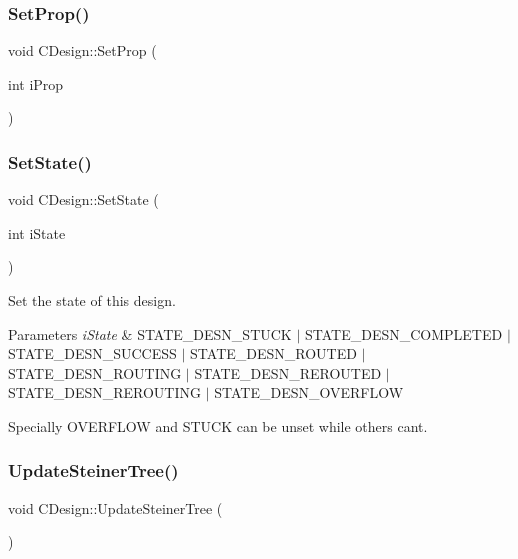 \subsubsection{\texorpdfstring{SetProp()}{SetProp()}}
{\footnotesize\ttfamily void C\+Design\+::\+Set\+Prop (\begin{DoxyParamCaption}\item[{int}]{i\+Prop }\end{DoxyParamCaption})}

\mbox{\label{classCDesign_adda7bcca7062f58a27baa043bd315bfd}} 
\subsubsection{\texorpdfstring{SetState()}{SetState()}}
{\footnotesize\ttfamily void C\+Design\+::\+Set\+State (\begin{DoxyParamCaption}\item[{int}]{i\+State }\end{DoxyParamCaption})}



Set the state of this design. 


\begin{DoxyParams}{Parameters}
{\em i\+State} & S\+T\+A\+T\+E\+\_\+\+D\+E\+S\+N\+\_\+\+S\+T\+U\+CK $\vert$ S\+T\+A\+T\+E\+\_\+\+D\+E\+S\+N\+\_\+\+C\+O\+M\+P\+L\+E\+T\+ED $\vert$ S\+T\+A\+T\+E\+\_\+\+D\+E\+S\+N\+\_\+\+S\+U\+C\+C\+E\+SS $\vert$ S\+T\+A\+T\+E\+\_\+\+D\+E\+S\+N\+\_\+\+R\+O\+U\+T\+ED $\vert$ S\+T\+A\+T\+E\+\_\+\+D\+E\+S\+N\+\_\+\+R\+O\+U\+T\+I\+NG $\vert$ S\+T\+A\+T\+E\+\_\+\+D\+E\+S\+N\+\_\+\+R\+E\+R\+O\+U\+T\+ED $\vert$ S\+T\+A\+T\+E\+\_\+\+D\+E\+S\+N\+\_\+\+R\+E\+R\+O\+U\+T\+I\+NG $\vert$ S\+T\+A\+T\+E\+\_\+\+D\+E\+S\+N\+\_\+\+O\+V\+E\+R\+F\+L\+OW\\
\hline
\end{DoxyParams}
Specially O\+V\+E\+R\+F\+L\+OW and S\+T\+U\+CK can be unset while others can\textquotesingle{}t. \mbox{\label{classCDesign_a9571bf3353ab819782f0162867e525dc}} 
\subsubsection{\texorpdfstring{UpdateSteinerTree()}{UpdateSteinerTree()}}
{\footnotesize\ttfamily void C\+Design\+::\+Update\+Steiner\+Tree (\begin{DoxyParamCaption}{ }\end{DoxyParamCaption})}

